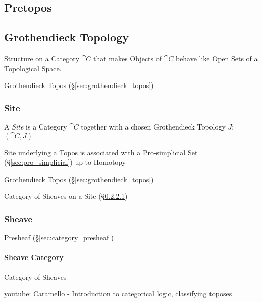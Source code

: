 \subsection{Pretopos}\label{sec:pretopos}

\subsection{Grothendieck Topology}\label{sec:grothendieck_topology}

Structure on a Category $\cat{C}$ that makes Objects of
$\cat{C}$ behave like Open Sets of a Topological Space.

Grothendieck Topos (\S\ref{sec:grothendieck_topos})



\subsubsection{Site}\label{sec:site}

A \emph{Site} is a Category $\cat{C}$ together with a chosen
Grothendieck Topology $J$: $(\cat{C},J)$

Site underlying a Topos is associated with a Pro-simplicial Set
(\S\ref{sec:pro_simplicial}) up to Homotopy

Grothendieck Topos (\S\ref{sec:grothendieck_topos})

Category of Sheaves on a Site (\S\ref{sec:sheave_category})



\subsubsection{Sheave}\label{sec:sheave}

Presheaf (\S\ref{sec:category_presheaf})



\paragraph{Sheave Category}\label{sec:sheave_category}\hfill

Category of Sheaves

youtube: Caramello - Introduction to categorical logic, classifying
toposes

